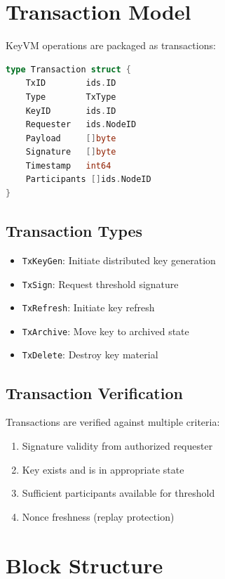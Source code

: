 \documentclass[11pt,twocolumn]{article}
\begin{document}
\section{Transaction Model}

KeyVM operations are packaged as transactions:

\begin{lstlisting}[language=Go,basicstyle=\ttfamily\small]
type Transaction struct {
    TxID        ids.ID
    Type        TxType
    KeyID       ids.ID
    Requester   ids.NodeID
    Payload     []byte
    Signature   []byte
    Timestamp   int64
    Participants []ids.NodeID
}
\end{lstlisting}

\subsection{Transaction Types}

\begin{itemize}
\item \texttt{TxKeyGen}: Initiate distributed key generation
\item \texttt{TxSign}: Request threshold signature
\item \texttt{TxRefresh}: Initiate key refresh
\item \texttt{TxArchive}: Move key to archived state
\item \texttt{TxDelete}: Destroy key material
\end{itemize}

\subsection{Transaction Verification}

Transactions are verified against multiple criteria:

\begin{enumerate}
\item Signature validity from authorized requester
\item Key exists and is in appropriate state
\item Sufficient participants available for threshold
\item Nonce freshness (replay protection)
\end{enumerate}

\section{Block Structure}
\end{document}
